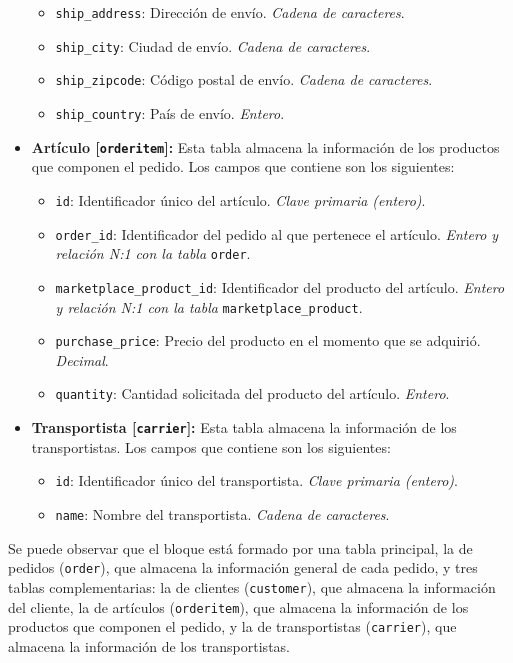 \begin{itemize}
\begin{itemize}
              \item \texttt{ship\_address}: Dirección de envío. \textit{Cadena de caracteres}.
              \item \texttt{ship\_city}: Ciudad de envío. \textit{Cadena de caracteres}.
              \item \texttt{ship\_zipcode}: Código postal de envío. \textit{Cadena de caracteres}.
              \item \texttt{ship\_country}: País de envío. \textit{Entero}.
          \end{itemize}
    \item \textbf{Artículo [\texttt{orderitem}]:} Esta tabla almacena la información de los productos que componen el pedido. Los campos que contiene son los siguientes:
          \begin{itemize}
              \item \texttt{id}: Identificador único del artículo. \textit{Clave primaria (entero)}.
              \item \texttt{order\_id}: Identificador del pedido al que pertenece el artículo. \textit{Entero y relación N:1 con la tabla} \texttt{order}.
              \item \texttt{marketplace\_product\_id}: Identificador del producto del artículo. \textit{Entero y relación N:1 con la tabla} \texttt{marketplace\_product}.
              \item \texttt{purchase\_price}: Precio del producto en el momento que se adquirió. \textit{Decimal}.
              \item \texttt{quantity}: Cantidad solicitada del producto del artículo. \textit{Entero}.
          \end{itemize}
    \item \textbf{Transportista [\texttt{carrier}]:} Esta tabla almacena la información de los transportistas. Los campos que contiene son los siguientes:
          \begin{itemize}
              \item \texttt{id}: Identificador único del transportista. \textit{Clave primaria (entero)}.
              \item \texttt{name}: Nombre del transportista. \textit{Cadena de caracteres}.
          \end{itemize}
\end{itemize}

Se puede observar que el bloque está formado por una tabla principal, la de pedidos (\texttt{order}), que almacena la información general de cada pedido, y tres tablas complementarias: la de clientes (\texttt{customer}), que almacena la información del cliente, la de artículos (\texttt{orderitem}), que almacena la información de los productos que componen el pedido, y la de transportistas (\texttt{carrier}), que almacena la información de los transportistas.

